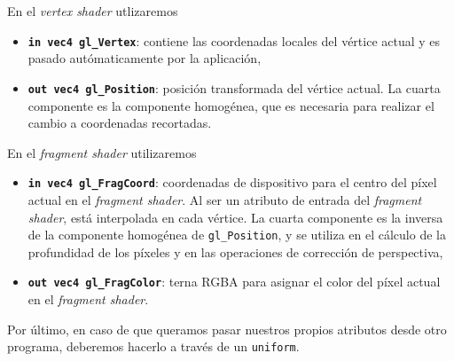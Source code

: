 En el \textit{vertex shader} utlizaremos
\begin{itemize}    
    \item \textbf{\texttt{in vec4 gl\_Vertex}}: contiene las coordenadas locales del vértice actual y es pasado autómaticamente por la aplicación,
    \item \textbf{\texttt{out vec4 gl\_Position}}: posición transformada del vértice actual. La cuarta componente es la componente homogénea, que es necesaria para realizar el cambio a coordenadas recortadas.
\end{itemize}
En el \textit{fragment shader} utilizaremos
\begin{itemize}
    \item \textbf{\texttt{in vec4 gl\_FragCoord}}: coordenadas de dispositivo para el centro del píxel actual en el \textit{fragment shader}. Al ser un atributo de entrada del \textit{fragment shader}, está interpolada en cada vértice. La cuarta componente es la inversa de la componente homogénea de \texttt{gl\_Position}, y se utiliza en el cálculo de la profundidad de los píxeles y en las operaciones de corrección de perspectiva,
    \item \textbf{\texttt{out vec4 gl\_FragColor}}: terna RGBA para asignar el color del píxel actual en el \textit{fragment shader}.
\end{itemize}
Por último, en caso de que queramos pasar nuestros propios atributos desde otro programa, deberemos hacerlo a través de un \texttt{uniform}.\newline

